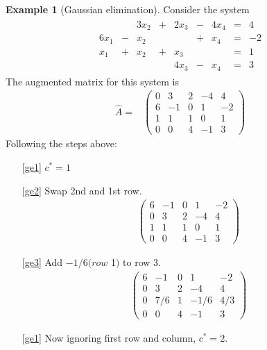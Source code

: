 \documentclass[12pt,reqno]{amsart}
\theoremstyle{definition}
\newtheorem{example}{Example}[section]
\begin{document}
\begin{example}[Gaussian elimination]
  Consider the system
  \begin{align*}
    \begin{array}{ccccccccc} 
      &   & 3x_2 & + & 2x_3 & - & 4x_4 & = & 4 \\
      6x_1 & - &  x_2 &   &      & +  & x_4 & = & -2 \\
      x_1 & + & x_2  & +   & x_3 &    &     & = & 1 \\
      &   &     &     & 4x_3 & - & x_4 & = &  3
    \end{array}
  \end{align*}
  The augmented matrix for this system is 
  \begin{align*}
    \hat{A} = & \begin{pmatrix} 
      0 &  3 &  2 & -4 & 4 \\
      6 & -1 &  0 & 1  & -2 \\
      1 & 1  &  1 & 0  & 1 \\
      0 & 0  & 4 & -1  & 3 
    \end{pmatrix}
  \end{align*}
  Following the steps above:
  \begin{itemize}
  \item[\ref{ge1}] $c^* = 1$
  \item[\ref{ge2}] Swap 2nd and 1st row.
    \begin{align*}
      \begin{pmatrix} 
        6 & -1 &  0 & 1  & -2 \\
        0 &  3 &  2 & -4 & 4 \\
        1 & 1  &  1 & 0  & 1 \\
        0 & 0  & 4 & -1  & 3 
      \end{pmatrix}
    \end{align*}
  \item[\ref{ge3}] Add $-1/6(row$ 1$)$ to row 3.
    \begin{align*}
      \begin{pmatrix} 
        6 & -1 &  0 & 1  & -2 \\
        0 &  3 &  2 & -4 & 4 \\
        0 & 7/6  &  1 & -1/6  & 4/3 \\
        0 & 0  & 4 & -1  & 3 
      \end{pmatrix}
    \end{align*}
  \item[\ref{ge1}] Now ignoring first row and column, $c^* = 2$.

\end{itemize}
\end{example}
\end{document}
